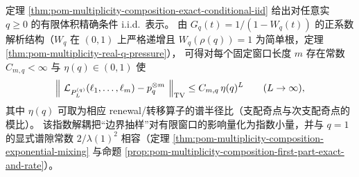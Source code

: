 \begin{remark}[有限窗张量化与一般 \texorpdfstring{$q\ge 0$}{q>=0} 的指数解耦]\label{rem:pom-multiplicity-composition-window-tensorization}
定理 \ref{thm:pom-multiplicity-composition-exact-conditional-iid} 给出对任意实 \(q\ge 0\) 的有限体积精确条件 i.i.d.\ 表示。
由 \(G_q(t)=1/(1-W_q(t))\) 的正系数解析结构（\(W_q\) 在 \((0,1)\) 上严格递增且 \(W_q(\rho(q))=1\) 为简单根，定理 \ref{thm:pom-multiplicity-real-q-pressure}），
可得对每个固定窗口长度 \(m\) 存在常数 \(C_{m,q}<\infty\) 与 \(\eta(q)\in(0,1)\) 使
\[
\Bigl\|\ \mathcal{L}_{P_L^{(q)}}(\ell_1,\dots,\ell_m)-p_q^{\otimes m}\ \Bigr\|_{\mathrm{TV}}
\le C_{m,q}\,\eta(q)^{L}
\qquad(L\to\infty),
\]
其中 \(\eta(q)\) 可取为相应 renewal/转移算子的谱半径比（支配奇点与次支配奇点的模比）。
该指数解耦把“边界抽样”对有限窗口的影响量化为指数小量，并与 \(q=1\) 的显式谱隙常数 \(2/\lambda(1)^2\) 相容（定理 \ref{thm:pom-multiplicity-composition-exponential-mixing} 与命题 \ref{prop:pom-multiplicity-composition-first-part-exact-and-rate}）。
\end{remark}

\endinput


